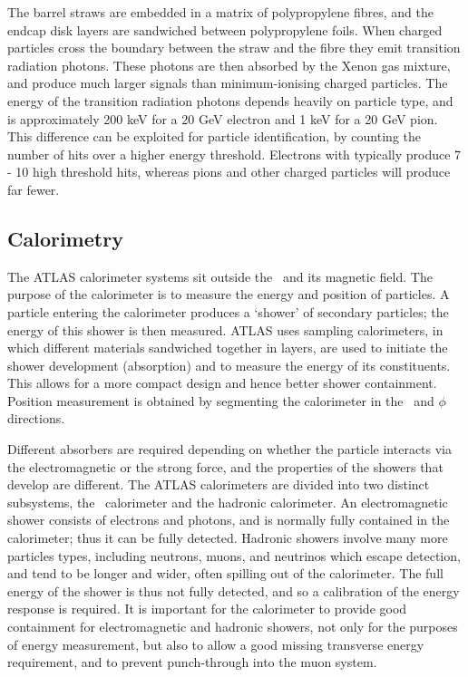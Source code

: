The barrel straws are embedded in a matrix of 
polypropylene fibres, and the endcap disk layers are sandwiched between 
polypropylene foils. When charged particles cross the boundary between the straw
and the fibre they emit transition radiation photons. These photons are then
absorbed by the Xenon gas mixture, and produce much larger signals than
minimum-ionising charged particles. The energy of the transition radiation
photons depends heavily on particle type, and is approximately 200 keV for a 20
GeV electron and 1 keV for a 20 GeV pion. This difference can be exploited for
particle identification, by counting the number of hits over a higher energy threshold.
Electrons with  typically produce 7 - 10 high threshold hits, whereas
pions and other charged particles will produce far fewer.

\subsection{Calorimetry}

The ATLAS
calorimeter systems sit outside the \id\ and its magnetic field. 
The purpose of the calorimeter is to measure the energy and
position of particles. A particle entering the calorimeter produces a
`shower' of secondary particles; the energy of this shower is then measured.
ATLAS uses sampling calorimeters, in which different materials sandwiched
together in layers, are used to initiate the shower development (absorption) and
to measure the energy of its constituents. This
allows for a more compact design and hence better shower containment. Position
measurement is obtained by segmenting the calorimeter in the \z\ and $\phi$
directions.

Different absorbers are required depending on whether the particle interacts
via the electromagnetic or the strong force, and the properties of the showers that develop
are different. The ATLAS calorimeters are divided into two distinct subsystems,
the \emag\ calorimeter and the hadronic calorimeter. An electromagnetic
shower consists of electrons and photons, and is normally fully contained in the
calorimeter; thus it can be fully detected. Hadronic showers involve many more
particles types, including neutrons, muons, and neutrinos which escape detection, and tend
to be longer and wider, often spilling out of the calorimeter. The full energy
of the shower is thus not fully detected, and so a calibration of the energy
response is required. It is important for the calorimeter to provide good
containment for electromagnetic and hadronic showers, not only for the purposes
of energy measurement, but also to allow a good missing transverse energy
requirement, and to prevent punch-through into the muon system.

